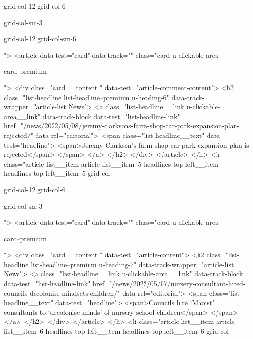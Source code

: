 {{{			
			
			grid-col-12
			grid-col-6
			
			
			
			
			
			grid-col-sm-3
			
			
			
			grid-col-12 grid-col-sm-6
			
			
			
			
			">
<article data-test="card" data-track="" class="card
			u-clickable-area
			
			
			card--premium
			
			
			
			
			
			 ">
<div class="card__content " data-test="article-comment-content">
<h2 class="list-headline list-headline--premium u-heading-6" data-track-wrapper="article-list News">
<a class="list-headline__link u-clickable-area__link" data-track-block data-test="list-headline-link" href="/news/2022/05/08/jeremy-clarksons-farm-shop-car-park-expansion-plan-rejected/" data-rel="editorial">
<span class="list-headline__text" data-test="headline">
<span>Jeremy Clarkson’s farm shop car park expansion plan is rejected</span>
</span>
</a>
</h2>
</div>
</article>
</li>
<li class="article-list__item article-list__item--5 headlines-top-left__item headlines-top-left__item--5
			grid-col
			
			
			
			grid-col-12
			grid-col-6
			
			
			
			
			
			grid-col-sm-3
			
			
			
			
			
			
			
			
			">
<article data-test="card" data-track="" class="card
			u-clickable-area
			
			
			card--premium
			
			
			
			
			
			 ">
<div class="card__content " data-test="article-content">
<h2 class="list-headline list-headline--premium u-heading-7" data-track-wrapper="article-list News">
<a class="list-headline__link u-clickable-area__link" data-track-block data-test="list-headline-link" href="/news/2022/05/07/nursery-consultant-hired-councils-decolonise-mindsets-children/" data-rel="editorial">
<span class="list-headline__text" data-test="headline">
<span>Councils hire ‘Maoist’ consultants to ‘decolonise minds’ of nursery school children</span>
</span>
</a>
</h2>
</div>
</article>
</li>
<li class="article-list__item article-list__item--6 headlines-top-left__item headlines-top-left__item--6
			grid-col
			
}}}
